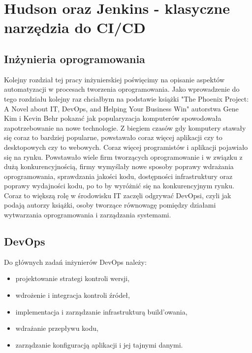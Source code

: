\section{Hudson oraz Jenkins - klasyczne narzędzia do CI/CD}

\subsection{Inżynieria oprogramowania}
Kolejny rozdział tej pracy inżynierskiej poświęcimy na opisanie aspektów automatyzacji w procesach tworzenia oprogramowania. 
Jako wprowadzenie do tego rozdziału kolejny raz chciałbym na podstawie książki "The Phoenix Project: A Novel about IT, DevOps, and Helping Your Business Win" autorstwa Gene Kim i Kevin Behr pokazać jak popularyzacja komputerów spowodowała zapotrzebowanie na nowe technologie. 
Z biegiem czasów gdy komputery stawały się coraz to bardziej popularne, powstawało coraz więcej aplikacji czy to desktopowych czy to webowych. Coraz więcej programistów i aplikacji pojawiało się na rynku. Powstawało wiele firm tworzących oprogramowanie i w związku z dużą konkurencyjnością, firmy wymyślały nowe sposoby poprawy wdrażania oprogramowania, sprawdzania jakości kodu, dostępności infrastruktury oraz poprawy wydajności kodu, po to by wyróżnić się na konkurencyjnym rynku. Coraz to większą rolę w środowisku IT zaczęli odgrywać  DevOpsi, czyli jak podają autorzy książki, osoby tworzące równowagę pomiędzy działami wytwarzania oprogramowania i zarządzania systemami.  


\subsection{DevOps} 
Do głównych zadań inżynierów DevOps należy:
\begin{itemize}
    \item projektowanie strategi kontroli wersji,
    \item wdrożenie i integracja kontroli źródeł,
    \item implementacja i zarządzanie infrastrukturą build'owania,
    \item wdrażanie przepływu kodu,
    \item zarządzanie konfiguracją aplikacji i jej tajnymi danymi.
\end{itemize}

